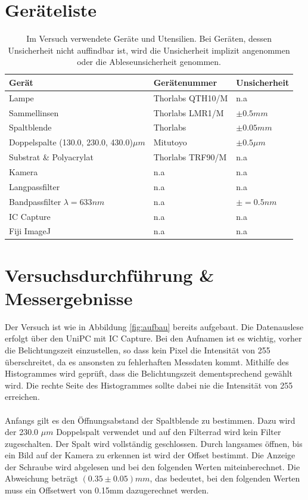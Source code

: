 \documentclass[12pt,a4paper,twoside]{article}
\begin{document}
\section{Geräteliste} %

    \begin{table}[H]
        \centering
        \caption{Im Versuch verwendete Geräte und Utensilien. Bei Geräten, dessen Unsicherheit nicht auffindbar ist, wird die Unsicherheit implizit angenommen oder die Ableseunsicherheit genommen. }
        \label{tab:geraete}
        \begin{tabular}{| l | l | l |}
            \hline
            Gerät    & Gerätenummer  & Unsicherheit \\
            \hline
            Lampe & Thorlabs QTH10/M & {n.a} \\
            Sammellinsen & Thorlabs LMR1/M & $\pm 0.5 mm$ \\
            Spaltblende & Thorlabs & $\pm 0.05 mm$ \\
            Doppelspalte (130.0, 230.0, 430.0)$\mu m$ & Mitutoyo & $\pm 0.5 \mu m$ \\
            Substrat \& Polyacrylat & Thorlabs TRF90/M & {n.a} \\
            Kamera & {n.a} & {n.a} \\
            Langpassfilter  & {n.a} & {n.a} \\
            Bandpassfilter $\lambda = 633 nm$& {n.a} & $\pm = 0.5 nm$ \\
            IC Capture & {n.a} & {n.a} \\
            Fiji ImageJ & {n.a} & {n.a} \\
            \hline
        \end{tabular}
    \end{table}


\section{Versuchsdurchführung \& Messergebnisse} %
Der Versuch ist wie in Abbildung \ref{fig:aufbau} bereits aufgebaut. Die Datenauslese erfolgt über den UniPC mit IC Capture. 
Bei den Aufnamen ist es wichtig, vorher die Belichtungszeit einzustellen, so dass kein Pixel die Intensität von 255 überschreitet, da es ansonsten zu fehlerhaften Messdaten kommt. 
Mithilfe des Histogrammes wird geprüft, dass die Belichtungszeit dementsprechend gewählt wird. Die rechte Seite des Histogrammes sollte dabei nie die Intensität von 255 erreichen. 
\\
\\
Anfangs gilt es den Öffnungsabstand der Spaltblende zu bestimmen. Dazu wird der 230.0 $\mu m$ Doppelspalt verwendet und auf den Filterrad wird kein Filter zugeschalten. 
Der Spalt wird vollständig geschlossen. Durch langsames öffnen, bis ein Bild auf der Kamera zu erkennen ist wird der Offset bestimmt. Die Anzeige der Schraube wird abgelesen und bei den folgenden Werten miteinberechnet. 
Die Abweichung beträgt $(0.35 \pm 0.05) mm$, das bedeutet, bei den folgenden Werten muss ein Offsetwert von 0.15mm dazugerechnet werden. 
\end{document}
